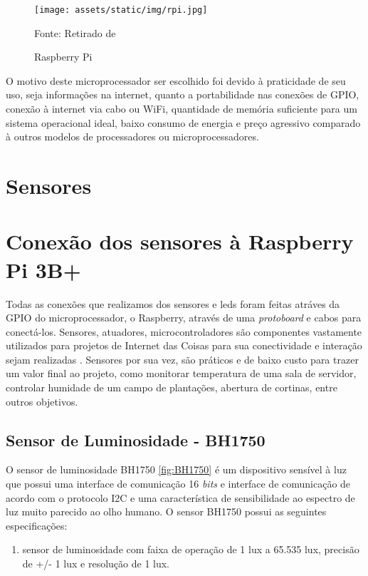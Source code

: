 \documentclass[../../layout.tex]{subfiles}
\begin{document}
\begin{figure}[H]
\centering
\caption{Raspberry Pi}
\texttt{[image: assets/static/img/rpi.jpg]}
\label{fig:rpi}

\begin{minipage}{0.5\textwidth}
\raggedright \footnotesize Fonte: Retirado de \cite{rpi}
\end{minipage}
\end{figure}

\hspace*{3em}O motivo deste microprocessador ser escolhido foi devido à praticidade de seu uso, seja informações na internet, quanto a portabilidade nas conexões de GPIO, conexão à internet via cabo ou WiFi, quantidade de memória suficiente para um sistema operacional ideal, baixo consumo de energia e preço agressivo comparado à outros modelos de processadores ou microprocessadores.

\section{Sensores}
\section{Conexão dos sensores à Raspberry Pi 3B+}
\hspace*{3em}Todas as conexões que realizamos dos sensores e leds foram feitas atráves da GPIO do microprocessador, o Raspberry, através de uma \emph{protoboard} e cabos para conectá-los.
\hspace*{3em}Sensores, atuadores, microcontroladores são componentes vastamente utilizados para projetos de Internet das Coisas para sua conectividade e interação sejam realizadas \cite{sensores_iot}. Sensores por sua vez, são práticos e de baixo custo para trazer um valor final ao projeto, como monitorar temperatura de uma sala de servidor, controlar humidade de um campo de plantações, abertura de cortinas, entre outros objetivos.
\subsection{Sensor de Luminosidade - BH1750}
\hspace*{3em}O sensor de luminosidade BH1750 \ref{fig:BH1750} é um dispositivo sensível à luz que possui uma interface de comunicação 16 \emph{bits} e interface de comunicação de acordo com o protocolo I2C e uma característica de sensibilidade ao espectro de luz muito parecido ao olho humano.
\hspace*{3em}O sensor BH1750 possui as seguintes especificações:
\begin{enumerate}[label=\alph*)]
\itemsep0em
    \item sensor de luminosidade com faixa de operação de 1 lux a 65.535 lux, precisão de +/- 1 lux e resolução de 1 lux.
\end{enumerate}
\end{document}
